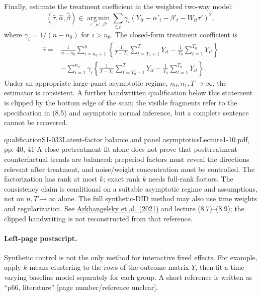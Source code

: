 Finally, estimate the treatment coefficient in the weighted two-way model:
\[
 (\widehat\tau,\widehat\alpha,\widehat\beta)
 \in\operatorname*{arg\,min}_{\tau',\alpha',\beta'}
 \sum_{i,t}\gamma_i
 (Y_{it}-\alpha'_i-\beta'_t-W_{it}\tau')^2,\tag{8.8}
\]
where $\gamma_i=1/(n-n_0)$ for $i>n_0$.
 The closed-form treatment coefficient is
\begin{align*}
 \widehat\tau={}&\frac1{n-n_0}\sum_{i=n_0+1}^n
 \left\{\frac1{T-T_0}\sum_{t=T_0+1}^TY_{it}
 -\frac1{T_0}\sum_{t=1}^{T_0}Y_{it}\right\}\\
 &-\sum_{i=1}^{n_0}\gamma_i
 \left\{\frac1{T-T_0}\sum_{t=T_0+1}^TY_{it}
 -\frac1{T_0}\sum_{t=1}^{T_0}Y_{it}\right\}.
\end{align*}
 Under an appropriate large-panel asymptotic regime, $n_0,n_1,T\to\infty$, the estimator is consistent. A further handwritten qualification below this statement is clipped by the bottom edge of the scan; the visible fragments refer to the specification in (8.5) and asymptotic normal inference, but a complete sentence cannot be recovered.
\begin{reviewnote}{qualification}{S1-033}{Latent-factor balance and panel asymptotics}{Lecture1-10.pdf, pp. 40, 41}
A close pretreatment fit alone does not prove that posttreatment counterfactual trends are balanced: preperiod factors must reveal the directions relevant after treatment, and noise/weight concentration must be controlled. The factorization has rank at most $k$; exact rank $k$ needs full-rank factors. The consistency claim is conditional on a suitable asymptotic regime and assumptions, not on $n,T\to\infty$ alone. The full synthetic-DID method may also use time weights and regularization. See \href{https://www.aeaweb.org/articles?id=10.1257/aer.20190159}{Arkhangelsky et al. (2021)} and lecture (8.7)--(8.9); the clipped handwriting is not reconstructed from that reference.
\end{reviewnote}


\paragraph{Left-page postscript.}
Synthetic control is not the only method for interactive fixed effects. For example, apply $k$-means clustering to the rows of the outcome matrix $Y$, then fit a time-varying baseline model separately for each group. A short reference is written as ``p66, literature'' [page number/reference unclear].

